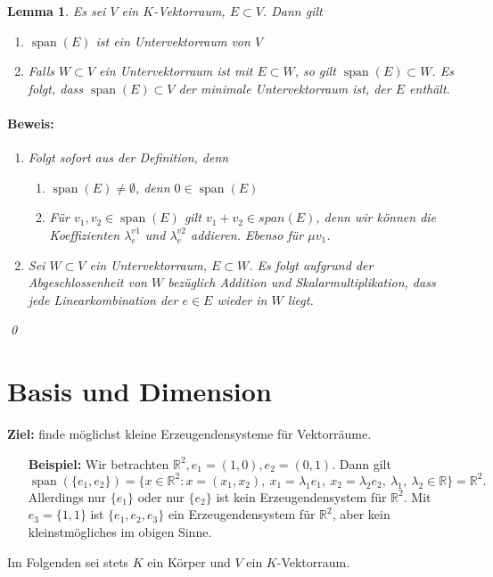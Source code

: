 \documentclass{report}
\newcommand{\lb}{\lambda}
\newcommand{\R}{\mathbb{R}}
\DeclareMathOperator{\Span}{span}
\theoremstyle{customrem}
\theoremstyle{customdef}
\newtheorem{lemma}[definition]{Lemma}
\renewenvironment{proof}{\paragraph{Beweis: }}{\qed}
\begin{document}
	\begin{lemma}
		Es sei $V$ ein $K$-Vektorraum, $E \subset V$. Dann gilt
		\begin{enumerate}
			\item $\Span(E)$ ist ein Untervektorraum von $V$
			\item Falls $W \subset V$ ein Untervektorraum ist mit $E \subset W$, so gilt $\Span(E) \subset W$. Es folgt, dass $\Span(E) \subset V$ der minimale Untervektorraum ist, der $E$ enthält.
		\end{enumerate}
		\vspace{.2cm}
		\begin{proof}
			\begin{enumerate}
				\item Folgt sofort aus der Definition, denn 
				\begin{enumerate}
					\item $\Span(E) \neq \emptyset$, denn $0 \in \Span(E)$
					\item Für $v_1, v_2 \in \Span(E)$ gilt $v_1 + v_2 \in span(E)$, denn wir können die Koeffizienten $\lb_e^{v1}$ und $\lb_e^{v2}$ addieren. Ebenso für $\mu v_1$.
				\end{enumerate}
				\item Sei $W \subset V$ ein Untervektorraum, $E \subset W$. Es folgt aufgrund der Abgeschlossenheit von $W$ bezüglich Addition und Skalarmultiplikation, dass jede Linearkombination der $e \in E$ wieder in $W$ liegt.
			\end{enumerate}
		\end{proof}
	\end{lemma}
	
	\section{Basis und Dimension}
	\hspace{-.25cm}\textbf{Ziel:} finde möglichst kleine Erzeugendensysteme für Vektorräume.
	\begin{enumerate}[leftmargin=1.4cm]
		\item[\textbf{Beispiel:}]Wir betrachten $\R^2, e_1=(1, 0), e_2 = (0,1)$. Dann gilt $$\Span(\{e_1, e_2\})
		= \{x \in \R^2 : x = (x_1, x_2),\ x_1 = \lb_1 e_1,\ x_2 = \lb_2 e_2,\ \lb_1,\ \lb_2 \in \R\} = \R^2.$$ 
		Allerdings nur $\{e_1\}$ oder nur $\{e_2\}$ ist kein Erzeugendensystem für $\R^2$. Mit $e_3 = \{1, 1\}$ ist $\{e_1, e_2, e_3\}$ ein Erzeugendensystem für $\R^2$, aber kein kleinstmögliches im obigen Sinne.
	\end{enumerate}
	\hspace{-.25cm}Im Folgenden sei stets $K$ ein Körper und $V$ ein $K$-Vektorraum.
	
\end{document}
